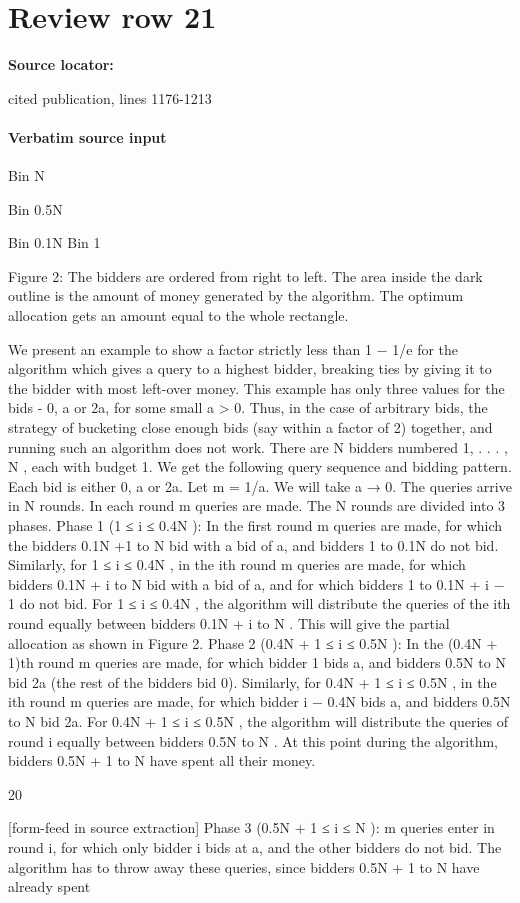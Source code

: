\documentclass[10pt]{article}
\begin{document}
\section*{Review row 21}
\textbf{Source locator:} {\footnotesize\raggedright cited publication, lines 1176-\allowbreak{}1213\par}
\paragraph{Verbatim source input}
\begin{ReviewVerbatim}
Bin N

Bin 0.5N

Bin 0.1N Bin 1

Figure 2: The bidders are ordered from right to left. The area inside the dark outline is the amount
of money generated by the algorithm. The optimum allocation gets an amount equal to the whole
rectangle.

We present an example to show a factor strictly less than 1 − 1/e for the algorithm which gives
a query to a highest bidder, breaking ties by giving it to the bidder with most left-over money.
This example has only three values for the bids - 0, a or 2a, for some small a > 0. Thus, in
the case of arbitrary bids, the strategy of bucketing close enough bids (say within a factor of
2) together, and running such an algorithm does not work.
There are N bidders numbered 1, . . . , N , each with budget 1. We get the following query
sequence and bidding pattern. Each bid is either 0, a or 2a. Let m = 1/a. We will take a → 0.
The queries arrive in N rounds. In each round m queries are made. The N rounds are divided
into 3 phases.
Phase 1 (1 ≤ i ≤ 0.4N ): In the first round m queries are made, for which the bidders 0.1N +1
to N bid with a bid of a, and bidders 1 to 0.1N do not bid. Similarly, for 1 ≤ i ≤ 0.4N , in
the ith round m queries are made, for which bidders 0.1N + i to N bid with a bid of a, and
for which bidders 1 to 0.1N + i − 1 do not bid.
For 1 ≤ i ≤ 0.4N , the algorithm will distribute the queries of the ith round equally between
bidders 0.1N + i to N . This will give the partial allocation as shown in Figure 2.
Phase 2 (0.4N + 1 ≤ i ≤ 0.5N ): In the (0.4N + 1)th round m queries are made, for which
bidder 1 bids a, and bidders 0.5N to N bid 2a (the rest of the bidders bid 0). Similarly, for
0.4N + 1 ≤ i ≤ 0.5N , in the ith round m queries are made, for which bidder i − 0.4N bids a,
and bidders 0.5N to N bid 2a.
For 0.4N + 1 ≤ i ≤ 0.5N , the algorithm will distribute the queries of round i equally between
bidders 0.5N to N .
At this point during the algorithm, bidders 0.5N + 1 to N have spent all their money.

20


[form-feed in source extraction]
Phase 3 (0.5N + 1 ≤ i ≤ N ): m queries enter in round i, for which only bidder i bids at a,
and the other bidders do not bid.
The algorithm has to throw away these queries, since bidders 0.5N + 1 to N have already spent
\end{ReviewVerbatim}
\end{document}
